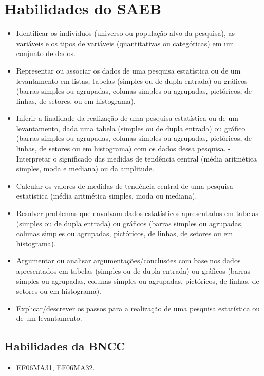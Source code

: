 {{{{\section*{Habilidades do SAEB} 
\begin{itemize}
\item Identificar os indivíduos (universo ou
população-alvo da pesquisa), as variáveis e os tipos de variáveis
(quantitativas ou categóricas) em um conjunto de dados.
\item
  Representar ou associar os dados de uma pesquisa estatística ou de um
  levantamento em listas, tabelas (simples ou de dupla entrada) ou
  gráficos (barras simples ou agrupadas, colunas simples ou agrupadas,
  pictóricos, de linhas, de setores, ou em histograma).
\item
  Inferir a finalidade da realização de uma pesquisa estatística ou de
  um levantamento, dada uma tabela (simples ou de dupla entrada) ou
  gráfico (barras simples ou agrupadas, colunas simples ou agrupadas,
  pictóricos, de linhas, de setores ou em histograma) com os dados dessa
  pesquisa. - Interpretar o significado das medidas de tendência central
  (média aritmética simples, moda e mediana) ou da amplitude.
\item
  Calcular os valores de medidas de tendência central de uma pesquisa
  estatística (média aritmética simples, moda ou mediana).
\item
  Resolver problemas que envolvam dados estatísticos apresentados em
  tabelas (simples ou de dupla entrada) ou gráficos (barras simples ou
  agrupadas, colunas simples ou agrupadas, pictóricos, de linhas, de
  setores ou em histograma).
\item
  Argumentar ou analisar argumentações/conclusões com base nos dados
  apresentados em tabelas (simples ou de dupla entrada) ou gráficos
  (barras simples ou agrupadas, colunas simples ou agrupadas,
  pictóricos, de linhas, de setores ou em histograma).
\item
  Explicar/descrever os passos para a realização de uma pesquisa
  estatística ou de um levantamento.
\end{itemize}

\subsection{Habilidades da BNCC}
\begin{itemize} 
\item EF06MA31, EF06MA32.
\end{itemize}


}}}}
